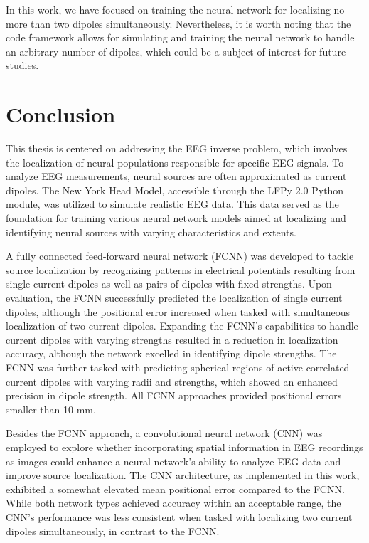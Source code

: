 \documentclass[a4paper, UKenglish, 11pt]{uiomaster}
\begin{document}
In this work, we have focused on training the neural network for localizing no more than two dipoles simultaneously. Nevertheless, it is worth noting that the code framework allows for simulating and training the neural network to handle an arbitrary number of dipoles, which could be a subject of interest for future studies.

\section{Conclusion} \label{sec:Conclusion}
This thesis is centered on addressing the EEG inverse problem, which involves the localization of neural populations responsible for specific EEG signals. To analyze EEG measurements, neural sources are often approximated as current dipoles. The New York Head Model, accessible through the LFPy 2.0 Python module, was utilized to simulate realistic EEG data. This data served as the foundation for training various neural network models aimed at localizing and identifying neural sources with varying characteristics and extents.

A fully connected feed-forward neural network (FCNN) was developed to tackle source localization by recognizing patterns in electrical potentials resulting from single current dipoles as well as pairs of dipoles with fixed strengths. Upon evaluation, the FCNN successfully predicted the localization of single current dipoles, although the positional error increased when tasked with simultaneous localization of two current dipoles. Expanding the FCNN's capabilities to handle current dipoles with varying strengths resulted in a reduction in localization accuracy, although the network excelled in identifying dipole strengths. The FCNN was further tasked with predicting spherical regions of active correlated current dipoles with varying radii and strengths, which showed an enhanced precision in dipole strength. All FCNN approaches provided positional errors smaller than 10 mm.

Besides the FCNN approach, a convolutional neural network (CNN) was employed to explore whether incorporating spatial information in EEG recordings as images could enhance a neural network's ability to analyze EEG data and improve source localization. The CNN architecture, as implemented in this work, exhibited a somewhat elevated mean positional error compared to the FCNN. While both network types achieved accuracy within an acceptable range, the CNN's performance was less consistent when tasked with localizing two current dipoles simultaneously, in contrast to the FCNN.
\end{document}
